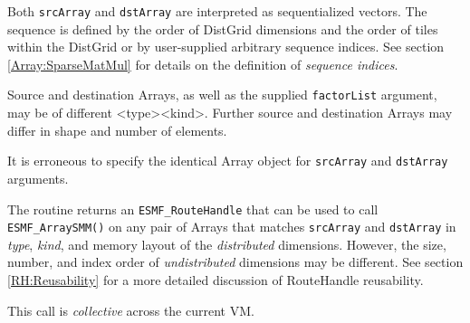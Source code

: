      Both {\tt srcArray} and {\tt dstArray} are interpreted as sequentialized
     vectors. The sequence is defined by the order of DistGrid dimensions and 
     the order of tiles within the DistGrid or by user-supplied arbitrary
     sequence indices. See section \ref{Array:SparseMatMul} for details on the
     definition of {\em sequence indices}.
  
     Source and destination Arrays, as well as the supplied {\tt factorList}
     argument, may be of different <type><kind>. Further source and
     destination Arrays may differ in shape and number of elements.
  
     It is erroneous to specify the identical Array object for {\tt srcArray} and
     {\tt dstArray} arguments.
  
     The routine returns an {\tt ESMF\_RouteHandle} that can be used to call 
     {\tt ESMF\_ArraySMM()} on any pair of Arrays that matches 
     {\tt srcArray} and {\tt dstArray} in {\em type}, {\em kind}, and 
     memory layout of the {\em distributed} dimensions. However, the size,
     number, and index order of {\em undistributed} dimensions may be different.
     See section \ref{RH:Reusability} for a more detailed discussion of
     RouteHandle reusability.
  
     This call is {\em collective} across the current VM.
  
